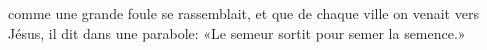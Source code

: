 \encetemps comme une grande foule se rassemblait,
	et que de chaque ville on venait vers Jésus,
	il dit dans une parabole:
	«Le semeur sortit pour semer la semence.»
